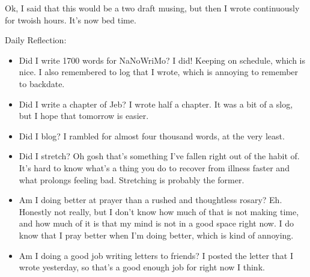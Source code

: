 \documentclass[12pt]{article}[titlepage]
\newcommand{\1}{\={a}}
\newcommand{\2}{\={e}}
\newcommand{\3}{\={\i}}
\newcommand{\4}{\=o}
\newcommand{\5}{\=u}
\newcommand{\6}{\={A}}
\renewcommand{\,}{\textsuperscript{,}}
\begin{document}
Ok, I said that this would be a two draft musing, but then I wrote continuously for twoish hours.
It's now bed time.

Daily Reflection:
\begin{itemize}
\item Did I write 1700 words for NaNoWriMo?
I did! Keeping on schedule, which is nice.
I also remembered to log that I wrote, which is annoying to remember to backdate.
\item Did I write a chapter of Jeb?
I wrote half a chapter.
It was a bit of a slog, but I hope that tomorrow is easier.
\item Did I blog? I rambled for almost four thousand words, at the very least.
\item Did I stretch? Oh gosh that's something I've fallen right out of the habit of.
It's hard to know what's a thing you do to recover from illness faster and what prolongs feeling bad.
Stretching is probably the former.
\item Am I doing better at prayer than a rushed and thoughtless rosary?
Eh. Honestly not really, but I don't know how much of that is not making time, and how much of it is that my mind is not in a good space right now.
I do know that I pray better when I'm doing better, which is kind of annoying.
\item Am I doing a good job writing letters to friends?
I posted the letter that I wrote yesterday, so that's a good enough job for right now I think.
\end{itemize}
\end{document}
